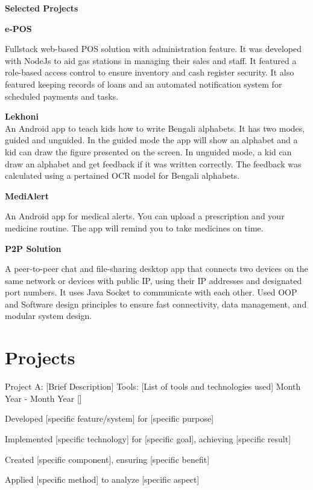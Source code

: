 \begin{rSection}{\textbf{Selected Projects}}

{\bf e-POS}\hfill{\hspace{2em} 

Fullstack web-based POS solution with administration feature. It was developed with NodeJs to aid gas stations in managing their sales and staff. It featured a role-based access control to ensure inventory and cash register security. It also featured keeping records of loans and an automated notification system for scheduled payments and tasks.}

{\bf Lekhoni}\\
An Android app to teach kids how to write Bengali alphabets. It has two modes, guided and unguided. In the guided mode the app will show an alphabet and a kid can draw the figure presented on the screen. In unguided mode, a kid can draw an alphabet and get feedback if it was written correctly. The feedback was calculated using a pertained OCR model for Bengali alphabets.

{\bf MediAlert}\hfill{\hspace{2em} 

An Android app for medical alerts. You can upload a prescription and your medicine routine. The app will remind you to take medicines on time.}



{\bf P2P Solution}\hfill{\hspace{2em} 

A peer-to-peer chat and file-sharing desktop app that connects two devices on the same network or devices with public IP, using their IP addresses and designated port numbers. It uses Java Socket to communicate with each other. Used OOP and Software design principles to ensure fast connectivity, data management, and modular system design.}

\end{rSection}



\section{\textbf{Projects}}
\vspace{-0.4mm}
\resumeSubHeadingListStart

\resumeProject
  {Project A: [Brief Description]}
  {Tools: [List of tools and technologies used]}
  {Month Year - Month Year}
  {{}[\href{https://github.com/your-username/project-a}{\textcolor{darkblue}{\faGithub}}]}
\resumeItemListStart
  \item Developed [specific feature/system] for [specific purpose]
  \item Implemented [specific technology] for [specific goal], achieving [specific result]
  \item Created [specific component], ensuring [specific benefit]
  \item Applied [specific method] to analyze [specific aspect]
\resumeItemListEnd

